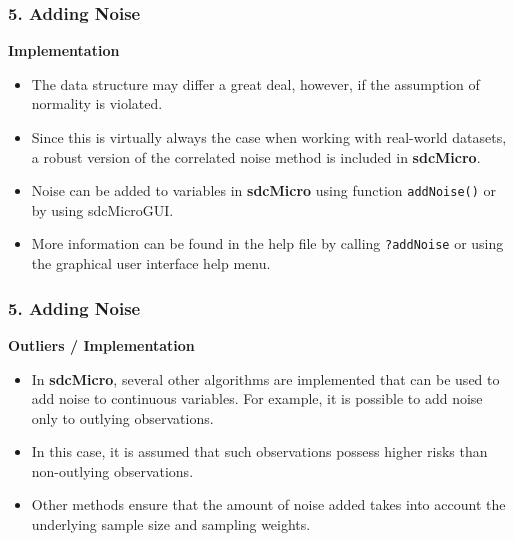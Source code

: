 \documentclass{beamer}
\begin{document}
\begin{frame}
	\frametitle{5. Adding Noise}
	\textbf{Implementation}
	\begin{itemize}
		\item The data structure may differ a great deal,
		however, if the assumption of normality is violated. 
		\item Since this is virtually always
		the case when working with real-world datasets, a robust version of the correlated
		noise method is included in \textbf{sdcMicro}. 
		\item Noise can be added to variables in \textbf{sdcMicro} using function \texttt{addNoise()} or by
		using sdcMicroGUI.
		\item More information can be found in the help ﬁle by calling \texttt{?addNoise} or using the graphical
		user interface help menu.
	\end{itemize}
\end{frame}
\begin{frame}
	\frametitle{5. Adding Noise}
	\textbf{Outliers / Implementation}
	\begin{itemize}
		\item In \textbf{sdcMicro}, several other algorithms are implemented that can be used to add
		noise to continuous variables. For example, it is possible to add noise only to outlying observations. 
		\item In this case, it is assumed that such observations possess higher risks than non-outlying observations.
		
		
		\item Other methods ensure that the amount of
		noise added takes into account the underlying sample size and sampling weights.
		
	\end{itemize}
\end{frame}
\end{document}

